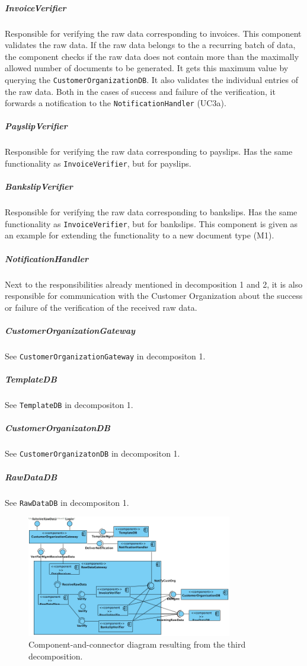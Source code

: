 \documentclass[a4paper,10pt]{article}
\begin{document}
\subparagraph{InvoiceVerifier} Responsible for verifying the raw data corresponding to invoices. This component validates the raw data. If the raw data belongs to the a recurring batch of data, the component checks if the raw data does not contain more than the maximally allowed number of documents to be generated. It gets this maximum value by querying the \texttt{CustomerOrganizationDB}. It also validates the individual entries of the raw data. Both in the cases of success and failure of the verification, it forwards a notification to the \texttt{NotificationHandler} (UC3a).

\subparagraph{PayslipVerifier} Responsible for verifying the raw data corresponding to payslips. Has the same functionality as \texttt{InvoiceVerifier}, but for payslips.

\subparagraph{BankslipVerifier} Responsible for verifying the raw data corresponding to bankslips. Has the same functionality as \texttt{InvoiceVerifier}, but for bankslips. This component is given as an example for extending the functionality to a new document type (M1).

\subparagraph{NotificationHandler} Next to the responsibilities already mentioned in decomposition 1 and 2, it is also responsible for communication with the Customer Organization about the success or failure of the verification of the received raw data.

\subparagraph{CustomerOrganizationGateway} See \texttt{CustomerOrganizationGateway} in decompositon 1.

\subparagraph{TemplateDB} See \texttt{TemplateDB} in decompositon 1.
\subparagraph{CustomerOrganizatonDB} See \texttt{CustomerOrganizatonDB} in decompositon 1.
\subparagraph{RawDataDB} See \texttt{RawDataDB} in decompositon 1.

\begin{figure}[!htp]
	\centering
	\includegraphics[width=0.8\textwidth]{RawDataGateway.png}
	\caption{Component-and-connector diagram resulting from the third decomposition.
	}\label{fig:compandcondecomp3}
\end{figure}
\end{document}

